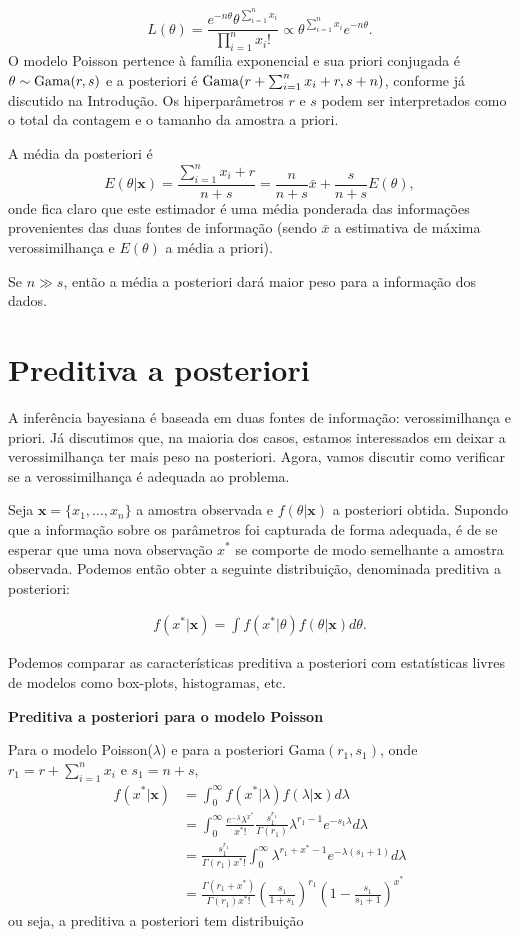 \documentclass[
  letterpaper,
  DIV=11,
  numbers=noendperiod]{scrreprt}
\theoremstyle{plain}
\theoremstyle{definition}
\theoremstyle{definition}
\theoremstyle{remark}
\begin{document}
\[L(\theta)=\frac{e^{-n\theta}\theta^{\sum_{i=1}^{n}x_i}}{\prod_{i=1}^{n}x_i!}\propto \theta^{\sum_{i=1}^n x_i}e^{-n\theta}.\]
O modelo Poisson pertence à família exponencial e sua priori conjugada é
\(\theta\sim\hbox{Gama}(r,s)\) e a posteriori é
\(\hbox{Gama}(r+\sum_{i=1}^n x_i+r, s+n)\), conforme já discutido na
Introdução. Os hiperparâmetros \(r\) e \(s\) podem ser interpretados
como o total da contagem e o tamanho da amostra a priori.

A média da posteriori é
\[E(\theta|\mathbf{x})=\frac{\sum_{i=1}^{n}x_i+r}{n+s}=\frac{n}{n+s}\bar{x}+\frac{s}{n+s}E(\theta),\]
onde fica claro que este estimador é uma média ponderada das informações
provenientes das duas fontes de informação (sendo \(\bar{x}\) a
estimativa de máxima verossimilhança e \(E(\theta)\) a média a priori).

Se \(n\gg s\), então a média a posteriori dará maior peso para a
informação dos dados.

\section{Preditiva a posteriori}\label{preditiva-a-posteriori}

A inferência bayesiana é baseada em duas fontes de informação:
verossimilhança e priori. Já discutimos que, na maioria dos casos,
estamos interessados em deixar a verossimilhança ter mais peso na
posteriori. Agora, vamos discutir como verificar se a verossimilhança é
adequada ao problema.

Seja \(\boldsymbol{x}=\{x_1,\ldots,x_n\}\) a amostra observada e
\(f(\theta|\boldsymbol{x})\) a posteriori obtida. Supondo que a
informação sobre os parâmetros foi capturada de forma adequada, é de se
esperar que uma nova observação \(x^*\) se comporte de modo semelhante a
amostra observada. Podemos então obter a seguinte distribuição,
denominada preditiva a posteriori:

\[\begin{align}f(x^*|\boldsymbol{x})=\int f(x^*|\theta)f(\theta|\boldsymbol{x})d\theta.\end{align}\]

Podemos comparar as características preditiva a posteriori com
estatísticas livres de modelos como box-plots, histogramas, etc.

\textbf{Preditiva a posteriori para o modelo Poisson}

Para o modelo Poisson(\(\lambda\)) e para a posteriori
Gama\((r_1,s_1)\), onde \(r_1=r+\sum_{i=1}^n x_i\) e \(s_1=n+s\),
\[\begin{align}
f(x^*|\boldsymbol{x})&=\int_0^\infty f(x^*|\lambda)f(\lambda|\boldsymbol{x})d\lambda\\
&=\int_0^\infty\frac{e^{-\lambda}\lambda^{x^*}}{x^*!}\frac{s_1^{r_1}}{\Gamma(r_1)}\lambda^{r_1-1}e^{-s_1\lambda}d\lambda\\
&=\frac{s_1^{r_1}}{\Gamma(r_1)x^*!}\int_0^\infty \lambda^{r_1+x^*-1}e^{-\lambda(s_1+1)}d\lambda\\
&=\frac{\Gamma(r_1+x^*)}{\Gamma(r_1)x^*!}\left(\frac{s_1}{1+s_1}\right)^{r_1}\left(1 - \frac{s_1}{s_1+1}\right)^{x^*}
\end{align}\] ou seja, a preditiva a posteriori tem distribuição
\end{document}
